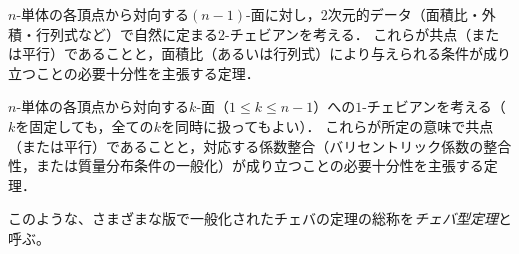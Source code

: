 \documentclass[a4paper,12pt]{bxjsbook}
\newlength{\customindent}
\newenvironment{body}{
  \par
  \begingroup
  \setlength{\leftskip}{\customindent}
  \setlength{\rightskip}{0pt}
  \setlength{\parindent}{1em}
  \setlength{\displayindent}{\customindent}
  \setlength{\displaywidth}{\dimexpr\linewidth-\customindent\relax}
}{
  \par
  \endgroup
}
\theoremstyle{theorem}
\begin{document}
\begin{body}
\begin{bodydescription}
            \item[\hspace*{1.5em}・候補C：$n$-単体版, 2-チェビアン]
            $n$-単体の各頂点から対向する$(n-1)$-面に対し，$2$次元的データ（面積比・外積・行列式など）で自然に定まる$2$-チェビアンを考える．
            これらが共点（または平行）であることと，面積比（あるいは行列式）により与えられる条件が成り立つことの必要十分性を主張する定理．
            
            \item[\hspace*{1.5em}・候補D：$n$単体版, multipede]\cite{multipede}
            $n$-単体の各頂点から対向する$k$-面（$1 \leq k \leq n-1$）への$1$-チェビアンを考える（$k$を固定しても，全ての$k$を同時に扱ってもよい）．
            これらが所定の意味で共点（または平行）であることと，対応する係数整合（バリセントリック係数の整合性，または質量分布条件の一般化）が成り立つことの必要十分性を主張する定理．
                
        \end{bodydescription}

        \indent このような、さまざまな版で一般化されたチェバの定理の総称を\emph{チェバ型定理}と呼ぶ。
    \end{body}
\end{document}

